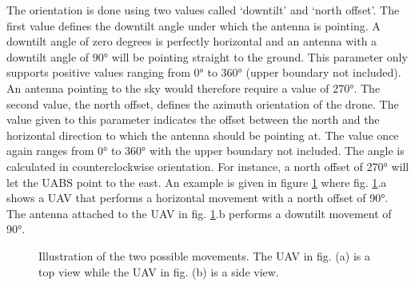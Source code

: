 The orientation is done using two values called `downtilt' and `north offset'. The first value
defines the downtilt angle under which the antenna is pointing. A downtilt angle of zero degrees is perfectly horizontal and 
an antenna with a downtilt angle of \ang{90} will be pointing straight to the ground.
This parameter only supports positive values ranging from \ang{0} to \ang{360} (upper boundary not included). An antenna pointing to the sky would therefore require a value of \ang{270}.
The second value, the north offset, defines the azimuth orientation of the drone. The value given to this parameter indicates the offset between the north
and the horizontal direction to which the antenna should be pointing at. The value once again ranges from \ang{0} to \ang{360} with the upper boundary not included. The
angle is calculated in counterclockwise orientation. For instance, a north offset of \ang{270} will let the \gls{UABS} point to the east.  
An example is given in figure \ref{fig:droneOrientations} where
fig. \ref{fig:droneOrientations}.a shows a \gls{UAV} that performs a horizontal movement with a north offset of \ang{90}.
The antenna attached to the \gls{UAV} in fig. \ref{fig:droneOrientations}.b performs a downtilt movement of \ang{90}.



\begin{figure}[!htb]
 \caption{Illustration of the two possible movements. The \gls{UAV} in fig. (a) is a top view while the \gls{UAV} in fig. (b) is a side view. }
  \label{fig:droneOrientations}
\end{figure}

